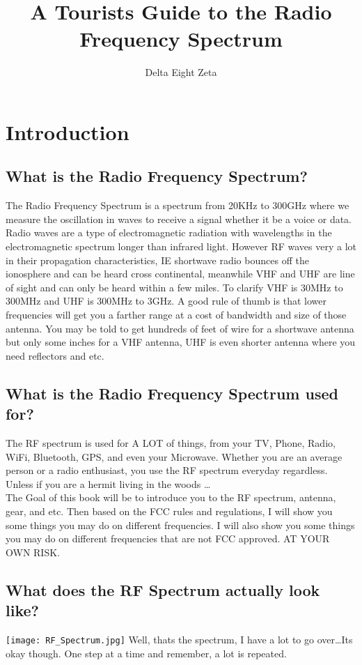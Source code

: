 \documentclass{book}
\title{A Tourists Guide to the Radio Frequency Spectrum}
\author{Delta Eight Zeta}
\begin{document}
    \maketitle
    \tableofcontents


    \chapter{Introduction}
    \section{What is the Radio Frequency Spectrum?}
        The Radio Frequency Spectrum is a spectrum from 20KHz to 300GHz where we measure the oscillation in waves to receive a signal whether it be a voice or data.
        Radio waves are a type of electromagnetic radiation with wavelengths in the electromagnetic spectrum longer than infrared light. 
        However RF waves very a lot in their propagation characteristics, IE shortwave radio bounces off the ionosphere and can be heard cross continental,
        meanwhile VHF and UHF are line of sight and can only be heard within a few miles.
        To clarify VHF is 30MHz to 300MHz and UHF is 300MHz to 3GHz. A good rule of thumb is that lower frequencies will get you a farther range at a cost
        of bandwidth and size of those antenna. You may be told to get hundreds of feet of wire for a shortwave antenna but only some inches for a VHF antenna,
        UHF is even shorter antenna where you need reflectors and etc.
    \section{What is the Radio Frequency Spectrum used for?}
        The RF spectrum is used for A LOT of things, from your TV, Phone, Radio, WiFi, Bluetooth, GPS, and even your Microwave.
        Whether you are an average person or a radio enthusiast, you use the RF spectrum everyday regardless. Unless if you are a 
        hermit living in the woods \ldots
        \\
        The Goal of this book will be to introduce you to the RF spectrum, antenna, gear, and etc.
        Then based on the FCC rules and regulations, I will show you some things you may do on different frequencies.
        I will also show you some things you may do on different frequencies that are not FCC approved. AT YOUR OWN RISK.\
    \section{What does the RF Spectrum actually look like?}
    \texttt{[image: RF\_Spectrum.jpg]}
        Well, thats the spectrum, I have a lot to go over\ldots Its okay though.
        One step at a time and remember, a lot is repeated.
\end{document}
